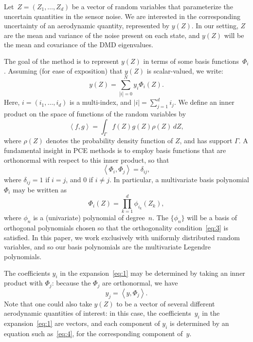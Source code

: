 \documentclass{aiaa-tc}%
\def\ip<#1,#2>{\left\langle #1,#2\right\rangle}
\begin{document}
Let~$Z=(Z_1,\ldots,Z_d)$ be a vector of random variables that
parameterize the uncertain quantities in the sensor noise. We are
interested in the corresponding uncertainty of an aerodynamic
quantity, represented by $y(Z)$.  In our setting, $Z$ are the mean and
variance of the noise present on each state, and $y(Z)$ will be the
mean and covariance of the DMD eigenvalues.

The goal of the method is to represent $y(Z)$ in terms of some basis
functions~$\Phi_i$. Assuming (for ease of exposition) that $y(Z)$ is
scalar-valued, we write:
\begin{equation}
  \label{eq:1}
  y(Z) = \sum_{|i|=0}^N y_i \Phi_i(Z).
\end{equation}
Here, $i=(i_1,\ldots,i_d)$ is a multi-index, and $|i|=\sum_{j=1}^d i_j$.  We define an inner
product on the space of functions of the random variables by
\begin{equation}
  \label{eq:2}
  \ip<f,g> = \int_\Gamma f(Z) g(Z) \rho(Z)\,dZ,
\end{equation}
where $\rho(Z)$ denotes the probability density function of $Z$, and
has support $\Gamma$.  A fundamental insight in PCE methods is to
employ basis functions that are orthonormal with respect to this
inner product, so that
\begin{equation}
  \label{eq:3}
  \ip<\Phi_i,\Phi_j> = \delta_{ij},
\end{equation}
where $\delta_{ij}=1$ if $i=j$, and $0$ if $i\ne j$. In particular,
a multivariate basis polynomial $\Phi_i$ may be written as
\begin{equation}
\Phi_i(Z) = \prod_{k=1}^d \phi_{i_k}(Z_k),
\end{equation}
where $\phi_n$ is a (univariate) polynomial of degree~$n$. The $\{ \phi_n\}$ will be a basis of
orthogonal polynomials chosen so that the orthogonality
condition~\eqref{eq:3} is satisfied. In this paper, we work
exclusively with uniformly distributed random variables, and so our
basis polynomials are the multivariate Legendre polynomials.

The coefficients $y_i$ in the expansion~\eqref{eq:1} may be determined
by taking an inner product with $\Phi_j$: because the $\Phi_j$ are
orthonormal, we have
\begin{equation}
  \label{eq:4}
  y_j = \ip<y,\Phi_j>.
\end{equation}
Note that one could also take $y(Z)$ to be a vector of several different
aerodynamic quantities of interest: in this case, the coefficients~$y_i$ in the
expansion~\eqref{eq:1} are vectors, and each component of $y_i$ is determined by
an equation such as~\eqref{eq:4}, for the corresponding component of~$y$.
\end{document}
